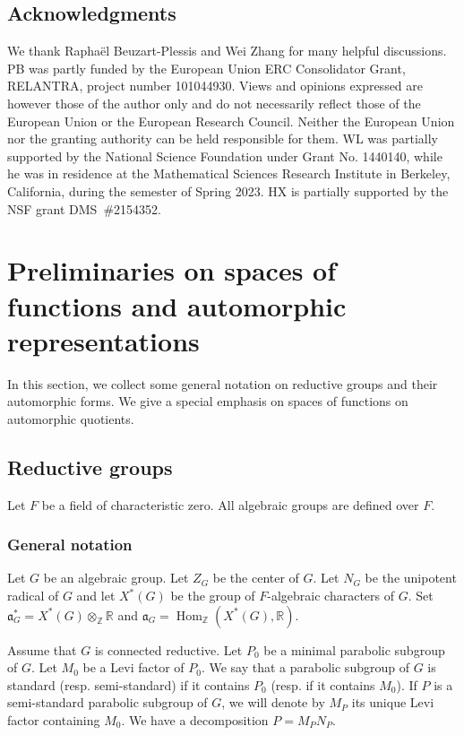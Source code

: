 \documentclass[letterpaper,11pt]{amsart}
\newcommand{\fa}{\mathfrak{a}}
\newcommand{\R}{\mathbb{R}}
\newcommand{\Z}{\mathbb{Z}}
\newcommand{\<}{\negthickspace}
\DeclareMathOperator{\Hom}{Hom}
\theoremstyle{definition}
\theoremstyle{plain}
\theoremstyle{remark}
\numberwithin{equation}{section}
\begin{document}
\subsection{Acknowledgments}
We thank Rapha\"el Beuzart-Plessis and Wei Zhang for many helpful discussions.
PB was partly funded by the European Union ERC Consolidator Grant, RELANTRA, project number 101044930. Views and opinions expressed are however those of the author only and do not necessarily reflect those of the European Union or the European Research Council. Neither the European Union nor the granting authority can be held responsible for them. WL was partially supported by the National Science Foundation under Grant No. 1440140, while he was in residence at the Mathematical Sciences Research Institute in Berkeley, California, during the semester of Spring 2023. HX is partially supported by the NSF grant DMS~\#2154352.

\section{Preliminaries on spaces of functions and automorphic representations}

\label{sec:preliminaries}

In this section, we collect some general notation on reductive groups and their automorphic forms. We give a special emphasis on spaces of functions on automorphic quotients.

\subsection{Reductive groups}

Let $F$ be a field of characteristic zero. All algebraic groups are defined over $F$.

\subsubsection{General notation}

Let $G$ be an algebraic group. Let $Z_G$ be the center of $G$. Let $N_G$ be the unipotent radical of $G$ and let $X^*(G)$ be the group of $F$-algebraic characters of $G$. Set $\fa^*_G=X^*(G) \otimes_{\Z} \R$ and $\fa_G=\Hom_\Z(X^*(G),\R)$. 

Assume that $G$ is connected reductive. Let $P_0$ be a minimal parabolic subgroup of $G$. Let $M_0$ be a Levi factor of $P_0$. We say that a parabolic subgroup of $G$ is standard (resp. semi-standard) if it contains $P_0$ (resp. if it contains $M_0$). If $P$ is a semi-standard parabolic subgroup of $G$, we will denote by $M_P$ its unique Levi factor containing $M_0$. We have a decomposition $P=M_P N_P$. 
\end{document}

